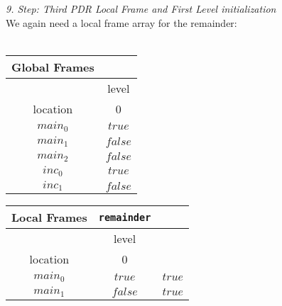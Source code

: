 \documentclass{article}
\begin{document}
	
	\textsl{9. Step: Third PDR Local Frame and First Level initialization} \\
	We again need a local frame array for the remainder: \\ \\
		\begin{minipage}{.5\textwidth}
		\setlength\tabcolsep{0.35em}
		\begin{center}
			\begin{tabu}{cc}
				Global Frames \\
				\toprule
				& level \\
				\cmidrule(lr){2-2}
				location & 0 \\
				$main_0$ & $true$ \\
				$main_1$ & $false$ \\
				$main_2$ & $false$ \\
				$inc_0$ & $true$ \\
				$inc_1$ & $false$\\
				\bottomrule
			\end{tabu}
		\end{center}
	\end{minipage}
	\hfill
	\begin{minipage}{.4\textwidth}
		\setlength\tabcolsep{0.35em}
		\begin{center}
			\begin{tabu}{ccc}
				Local Frames & \texttt{remainder}\\
				\toprule
				& level \\
				\cmidrule(lr){2-2}
				location & 0 \\
				\cmidrule{1-3}
				$main_0$ & $true$ & $true$ \\
				$main_1$ & $false$ & $true$\\
				\bottomrule
			\end{tabu}
		\end{center}	
	\end{minipage}
	
	\vspace*{1em}
	
\end{document}
